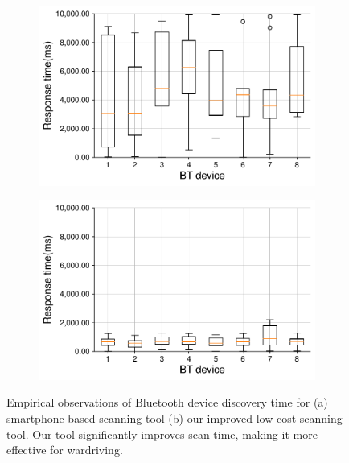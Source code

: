 \begin{figure}[h!]
    \centering
    \begin{subfigure}{0.48\textwidth}
        \includegraphics[width=\textwidth]{hyperscanner/plots/bluetana_default_out_inter_arrival_times.pdf}
        \caption{}
    \end{subfigure}
    \hfill
    \begin{subfigure}{0.48\textwidth}
        \includegraphics[width=\textwidth]{hyperscanner/plots/x300_26chan_switch_out_inter_arrival_times.pdf}
        \caption{}
    \end{subfigure}
    \captionsetup{justification=centering}
    \caption{Empirical observations of Bluetooth device discovery time for (a) smartphone-based scanning tool (b) our improved low-cost scanning tool. Our tool significantly improves scan time, making it more effective for wardriving.}
    \label{fig:hyperscanner:fulltest}
\end{figure}

